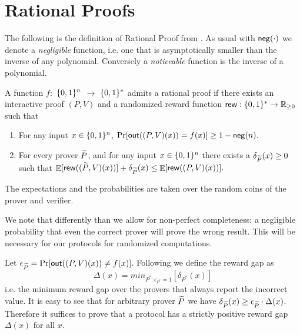 \section{Rational Proofs}

The following is the definition of Rational Proof from \cite{am}. As usual with $\mathsf{neg}(\cdot)$ we denote a {\em negligible} function, i.e. one that is asymptotically smaller than the inverse of any polynomial. Conversely a {\em noticeable} function is the inverse of a polynomial. 


\noindent
\begin{definition}
\label{def:RP-delta}
\label{def:RP}
A function $f:$ $\{0, 1\}^n$ $\to$ $\{0, 1\}^*$ admits a rational proof if there exists an interactive proof $(P,V)$ and a randomized reward function
$\mathsf{rew} : \{0, 1\}^{*} \to \mathbb{R}_{\geq 0}$ such that

\begin{enumerate}
\item \label{item:completeness} For any input $x \in 
\{0, 1\}^n$, $\Pr[\mathsf{out}((P,V)(x)) = f(x)] \geq 1 - \mathsf{neg}(n).$

\item For every prover $\widetilde{P}$, and for any input $x \in 
\{0, 1\}^n$ there exists a $\delta_{\widetilde{P}}(x) \geq 0$ such that 
$ \mathop{\mathbb{E}}[\mathsf{rew}((\widetilde{P},V)(x))] + \delta_{\widetilde{P}}(x) \leq \mathop{\mathbb{E}}[\mathsf{rew}((P,V)(x))]. $
\end{enumerate}
The expectations and the probabilities are taken over the random coins of the prover and verifier.
\end{definition} 
We note that differently than \cite{am} we allow for non-perfect completeness: a negligible probability that even the correct prover will prove the wrong result. This will be necessary for our protocols for randomized computations. 


\medskip
\noindent
Let $\epsilon_{\widetilde{P}} = \Pr[\mathsf{out}((P,V)(x)) \neq f(x)]$. 
Following \cite{ratargs} we define the {\sf reward gap} as 
\[ \Delta(x) = min_{P^* : \epsilon_{P^*}=1}[\delta_{P^*}(x)]  \]
i.e. the minimum reward gap over the provers that always report the incorrect value. 
It is easy to see that for arbitrary prover $\widetilde{P}$ we have $\delta_{\widetilde{P}}(x) \geq 
\epsilon_{\widetilde{P}} \cdot \Delta(x)$. Therefore it suffices to prove that a protocol has 
a strictly positive reward gap $\Delta(x)$ for all $x$. 


